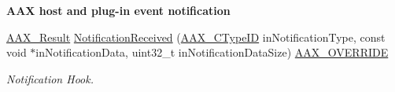 \begin{Indent}\textbf{ A\+AX host and plug-\/in event notification}\par
\begin{DoxyCompactItemize}
\item 
\mbox{\hyperlink{a00392_a4d8f69a697df7f70c3a8e9b8ee130d2f}{A\+A\+X\+\_\+\+Result}} \mbox{\hyperlink{a01481_af18b23ec6d4e60e60e27c209c17e573a}{Notification\+Received}} (\mbox{\hyperlink{a00392_ac678f9c1fbcc26315d209f71a147a175}{A\+A\+X\+\_\+\+C\+Type\+ID}} in\+Notification\+Type, const void $\ast$in\+Notification\+Data, uint32\+\_\+t in\+Notification\+Data\+Size) \mbox{\hyperlink{a00392_ac2f24a5172689ae684344abdcce55463}{A\+A\+X\+\_\+\+O\+V\+E\+R\+R\+I\+DE}}
\begin{DoxyCompactList}\small\item\em Notification Hook. \end{DoxyCompactList}\end{DoxyCompactItemize}
\end{Indent}
